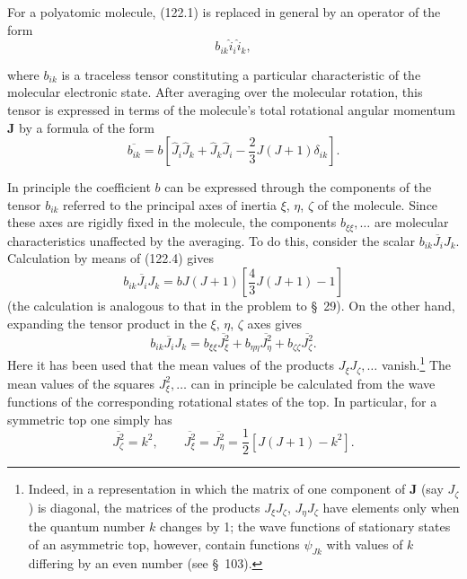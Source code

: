 For a polyatomic molecule, (122.1) is replaced in general by an operator of
the form
\begin{equation}
 b_{ik}\hat i_i\hat i_k,
 \tag{122.3}
\end{equation}

where $b_{ik}$ is a traceless tensor constituting a particular characteristic
of the molecular electronic state. After averaging over the molecular
rotation, this tensor is expressed in terms of the molecule's total rotational
angular momentum $\mathbf J$ by a formula of the form
\begin{equation}
 \overline{b_{ik}}=b\left[\hat J_i\hat J_k+\hat J_k\hat J_i
 -\frac23J(J+1)\delta_{ik}\right].
 \tag{122.4}
\end{equation}

In principle the coefficient $b$ can be expressed through the components of
the tensor $b_{ik}$ referred to the principal axes of inertia $\xi$, $\eta$,
$\zeta$ of the molecule. Since these axes are rigidly fixed in the molecule,
the components $b_{\xi\xi},\ldots$ are molecular characteristics unaffected
by the averaging. To do this, consider the scalar
$\overline{b_{ik}J_iJ_k}$. Calculation by means of (122.4) gives
\begin{equation}
 \overline{b_{ik}J_iJ_k}
 =bJ(J+1)\left[\frac43J(J+1)-1\right]
 \tag{122.5}
\end{equation}
(the calculation is analogous to that in the problem to \S~29). On the other
hand, expanding the tensor product in the $\xi$, $\eta$, $\zeta$ axes gives
\begin{equation}
 \overline{b_{ik}J_iJ_k}
 =b_{\xi\xi}\overline{J_\xi^2}
 +b_{\eta\eta}\overline{J_\eta^2}
 +b_{\zeta\zeta}\overline{J_\zeta^2}.
 \tag{122.6}
\end{equation}
Here it has been used that the mean values of the products
$J_\xi J_\zeta,\ldots$ vanish.\footnote{Indeed, in a representation in which
the matrix of one component of $\mathbf J$ (say $J_\zeta$) is diagonal, the
matrices of the products $J_\xi J_\zeta$, $J_\eta J_\zeta$ have elements only
when the quantum number $k$ changes by 1; the wave functions of stationary
states of an asymmetric top, however, contain functions $\psi_{Jk}$ with
values of $k$ differing by an even number (see \S~103).} The mean values of
the squares $J_\xi^2,\ldots$ can in principle be calculated from the wave
functions of the corresponding rotational states of the top. In particular,
for a symmetric top one simply has
\[
 \overline{J_\zeta^2}=k^2,\qquad
 \overline{J_\xi^2}=\overline{J_\eta^2}
 =\frac12[J(J+1)-k^2].
\]

